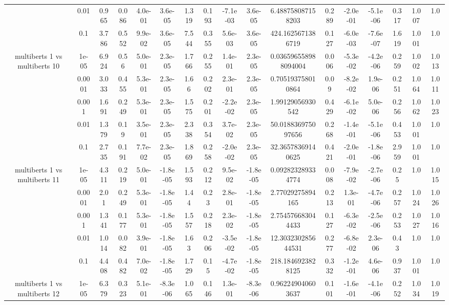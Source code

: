 \begin{tabular}{|c|c|c|c|c|c|c|c|c|c|c|c|c|c|c|c|c|}
 & 0.01 & 0.965 & 0.086 & 4.0e-01 & 3.6e-05 & 1.319 & 0.193 & -7.1e-03 & 3.6e-05 & 6.488758087158203 & 0.289 & -2.0e-01 & -5.1e-06 & 0.317 & 1.007 & 1.0 \\
 & 0.1 & 3.786 & 0.552 & 9.9e-02 & 3.6e-05 & 7.544 & 0.355 & 5.6e-03 & 3.6e-05 & 424.1625671386719 & 0.127 & -6.0e-03 & -7.6e-07 & 1.619 & 1.001 & 1.0 \\
\hline
\multirow{5}{*}{multiberts 1 vs multiberts 10} & 1e-05 & 6.924 & 0.56 & 5.0e-01 & 2.3e-05 & 1.766 & 0.255 & 1.4e-01 & 2.3e-05 & 0.036596558988094004 & 0.006 & -5.3e-02 & -4.2e-06 & 0.259 & 1.002 & 1.013 \\
 & 0.0001 & 3.033 & 0.455 & 5.3e-01 & 2.3e-05 & 1.66 & 0.202 & 2.3e-01 & 2.3e-05 & 0.705193758010864 & 0.09 & -8.2e-02 & 1.9e-06 & 0.251 & 1.064 & 1.011 \\
 & 0.001 & 1.691 & 0.249 & 5.3e-01 & 2.3e-05 & 1.575 & 0.201 & -2.2e-02 & 2.3e-05 & 1.99129056930542 & 0.429 & -6.1e-02 & 5.0e-06 & 0.256 & 1.062 & 1.023 \\
 & 0.01 & 1.379 & 0.19 & 3.5e-01 & 2.3e-05 & 2.338 & 0.354 & 3.7e-02 & 2.3e-05 & 50.018836975097656 & 0.268 & -1.4e-01 & -5.1e-06 & 0.453 & 1.001 & 1.0 \\
 & 0.1 & 2.735 & 0.191 & 7.7e-02 & 2.3e-05 & 1.869 & 0.258 & -2.0e-02 & 2.3e-05 & 32.36578369140625 & 0.421 & -2.0e-01 & -1.8e-06 & 2.959 & 1.001 & 1.0 \\
\hline
\multirow{5}{*}{multiberts 1 vs multiberts 11} & 1e-05 & 4.311 & 0.219 & 5.0e-01 & -1.8e-05 & 1.593 & 0.212 & 9.5e-02 & -1.8e-05 & 0.092823289334774 & 0.008 & -7.9e-02 & -2.7e-06 & 0.25 & 1.0 & 1.015 \\
 & 0.0001 & 2.01 & 0.249 & 5.3e-01 & -1.8e-05 & 1.44 & 0.23 & 2.8e-01 & -1.8e-05 & 2.77029275894165 & 0.213 & 1.3e-01 & -4.7e-06 & 0.257 & 1.024 & 1.026 \\
 & 0.001 & 1.341 & 0.177 & 5.3e-01 & -1.8e-05 & 1.557 & 0.218 & 2.3e-02 & -1.8e-05 & 2.754576683044433 & 0.127 & -6.3e-02 & -2.5e-06 & 0.253 & 1.027 & 1.016 \\
 & 0.01 & 1.014 & 0.082 & 3.9e-01 & -1.8e-05 & 1.63 & 0.206 & -3.5e-02 & -1.8e-05 & 12.303230285644531 & 0.277 & -6.8e-02 & 2.3e-06 & 0.43 & 1.0 & 1.0 \\
 & 0.1 & 4.408 & 0.482 & 7.0e-02 & -1.8e-05 & 1.729 & 0.15 & -4.7e-02 & -1.8e-05 & 218.1846923828125 & 0.332 & -1.2e-01 & 4.6e-06 & 0.937 & 1.001 & 1.0 \\
\hline
\multirow{5}{*}{multiberts 1 vs multiberts 12} & 1e-05 & 6.379 & 0.323 & 5.1e-01 & -8.3e-06 & 1.065 & 0.146 & 1.3e-01 & -8.3e-06 & 0.962249040603637 & 0.101 & -1.6e-01 & -4.1e-06 & 0.252 & 1.034 & 1.019 \\

\end{tabular}

